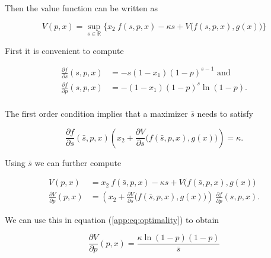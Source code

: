 \documentclass[american, abstract=on]{scrartcl}
\renewcommand{\Re}{\mathbb{R}}
\begin{document}
Then the value function can be written as 

\begin{equation}
  V(p, x) = \sup_{s \in \Re} \Big\{ x_2 \ f(s, p, x) - \kappa s + V\Big(f(s, p, x), g(x)\Big) \Big\}
\end{equation}

First it is convenient to compute

\begin{equation}
  \begin{split}
    \frac{\partial f}{\partial s}(s, p, x) &= -s (1 - x_1) (1 - p)^{s-1} \text{ and } \\
    \frac{\partial f}{\partial p}(s, p, x) &= -(1 - x_1) (1 - p)^{s}  \ln(1 - p). \\
  \end{split}
\end{equation}

The first order condition implies that a maximizer $\bar{s}$ needs to satisfy

\begin{equation} \label{app:eq:optimality}
  \frac{\partial f}{\partial s}(\bar{s}, p, x) \left(x_2 + \frac{\partial V}{\partial s}\Big(f(\bar{s}, p, x), g(x)\Big) \right) = \kappa.
\end{equation}

Using $\bar{s}$ we can further compute

\begin{equation}
  \begin{split}
    V(p, x) &=  x_2 \ f(\bar{s}, p, x) - \kappa s + V\Big(f(\bar{s}, p, x), g(x)\Big) \\
    \frac{\partial V}{\partial p}(p, x) &= \left(x_2 + \frac{\partial V}{\partial s}\Big(f(\bar{s}, p, x), g(x)\Big) \right) \ \frac{\partial f}{\partial p}(s, p, x).
  \end{split}
\end{equation}

We can use this in equation (\ref{app:eq:optimality}) to obtain

\begin{equation}
  \frac{\partial V}{\partial p}(p, x) = \frac{\kappa \ln(1 - p) (1 - p)}{\bar{s}}
\end{equation}
\end{document}

